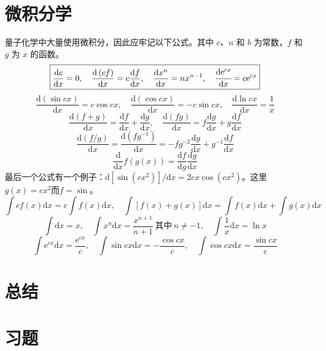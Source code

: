 	\section{微积分学}
	\label{sec:1.8 Calculus}
	量子化学中大量使用微积分，因此应牢记以下公式。其中 $c$、$n$ 和 $b$ 为常数，$f$ 和 $g$ 为 $x$ 的函数。
	\begin{equation*}
		\boxed{
			\frac{\mathrm{d}c}{\mathrm{d}x} = 0, \quad \frac{\mathrm{d}\left(cf\right)}{\mathrm{d}x} = c\frac{\mathrm{d}f}{\mathrm{d}x}, \quad \frac{\mathrm{d}x^n}{\mathrm{d}x} = nx^{n-1}, \quad \cfrac{\mathrm{d}\mathrm{e}^{cx}}{\mathrm{d}x} = c\mathrm{e}^{cx}
		}
	\end{equation*}
	\begin{equation*}
		\boxed{
			\frac{\mathrm{d}\left(\sin cx\right)}{\mathrm{d}x} = c \cos cx, \quad \frac{\mathrm{d} \left(\cos cx\right)}{\mathrm{d}x} = -c \sin cx, \quad \frac{\mathrm{d} \ln cx}{\mathrm{d} x } = \frac{1}{x}
		}
	\end{equation*}
	\begin{equation*}
		\boxed{
			\frac{\mathrm{d}\left(f+g\right)}{\mathrm{d}x} = \frac{\mathrm{d}f}{\mathrm{d}x}+\frac{\mathrm{d}g}{\mathrm{d}x}, \quad \frac{\mathrm{d}\left(fg\right)}{\mathrm{d}x} = f\frac{\mathrm{d}g}{\mathrm{d}x}+g\frac{\mathrm{d}f}{\mathrm{d}x}
		}
	\end{equation*}
	\begin{equation*}
		\boxed{
			\frac{\mathrm{d}\left(f/g\right)}{\mathrm{d}x} = \frac{\mathrm{d}\left(fg^{-1}\right)}{\mathrm{d}x} = -fg^{-2}\frac{\mathrm{d}g}{\mathrm{d}x}+g^{-1}\frac{\mathrm{d}f}{\mathrm{d}x}
		}
	\end{equation*}
	\begin{equation*}
		\boxed{
			\frac{\mathrm{d}}{\mathrm{d}x}f\left(g\left(x\right)\right) = \frac{\mathrm{d}f}{\mathrm{d}g}\frac{\mathrm{d}g}{\mathrm{d}x}
		}
	\end{equation*}
	最后一个公式有一个例子：$\mathrm{d}\left[\sin\left(cx^2\right)\right]/\mathrm{d}x = 2cx\cos\left(cx^2\right)$。这里$g\left(x\right) = cx^2$而$f=\sin$。
	\begin{equation*}
		\boxed{
			\int cf\left(x\right)\mathrm{d}x = c \int f\left(x\right)\mathrm{d}x, \quad \int \left[f\left(x\right)+g\left(x\right)\right]\mathrm{d}x = \int f\left(x\right)\mathrm{d}x+\int g\left(x\right)\mathrm{d}x
		}
	\end{equation*}
	\begin{equation*}
		\boxed{
			\int \mathrm{d}x = x, \quad \int x^n\mathrm{d}x = \frac{x^{n+1}}{n+1} \: \text{其中} \: n \neq -1, \quad \int \frac{1}{x}\mathrm{d}x = \ln x
		}
	\end{equation*}
	\begin{equation*}
		\boxed{
			\int \mathrm{e}^{cx}\mathrm{d}x = \frac{\mathrm{e}^{cx}}{c}, \quad \int \sin cx\mathrm{d}x = -\frac{\cos cx}{c}, \quad \int \cos cx\mathrm{d}x = \frac{\sin cx}{c}
		}
	\end{equation*}
	
	
	
	
	\section*{总结}

	\section*{习题}
